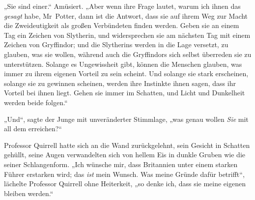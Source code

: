 „Sie sind einer.“ Amüsiert.
„Aber wenn ihre Frage lautet, warum ich ihnen das \emph{gesagt} habe, Mr~Potter, dann ist die Antwort, dass sie auf ihrem Weg zur Macht die Zweideutigkeit als großen Verbündeten finden werden. Geben sie an einem Tag ein Zeichen von Slytherin, und widersprechen sie am nächsten Tag mit einem Zeichen von Gryffindor; und die Slytherins werden in die Lage versetzt, zu glauben, was sie wollen, während auch die Gryffindors sich selbst überreden sie zu unterstützen. Solange es Ungewissheit gibt, können die Menschen glauben, was immer zu ihrem eigenen Vorteil zu sein scheint. Und solange sie stark erscheinen, solange sie zu gewinnen scheinen, werden ihre Instinkte ihnen sagen, dass ihr Vorteil bei ihnen liegt. Gehen sie immer im Schatten, und Licht und Dunkelheit werden beide folgen.“

„Und“, sagte der Junge mit unveränderter Stimmlage, „was genau wollen \emph{Sie} mit all dem erreichen?“

Professor Quirrell hatte sich an die Wand zurückgelehnt, sein Gesicht in Schatten gehüllt, seine Augen verwandelten sich von hellem Eis in dunkle Gruben wie die seiner Schlangenform.
„Ich wünsche mir, dass Britannien unter einem starken Führer erstarken wird; das \emph{ist} mein Wunsch. Was meine Gründe dafür betrifft“, lächelte Professor Quirrell ohne Heiterkeit, „so denke ich, dass sie meine eigenen bleiben werden.“

